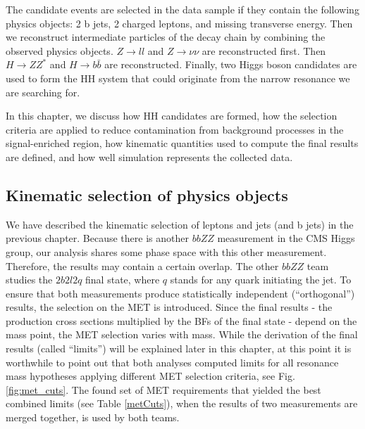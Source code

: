 The candidate events are selected in the data sample if they contain the following physics objects: 2 b jets, 2 charged leptons, and missing transverse energy. Then we reconstruct intermediate particles of the decay chain by combining the observed physics objects. $Z \to ll$ and $Z \to \nu \nu$ are reconstructed first. Then $H \to ZZ^*$ and $H \to b\bar{b}$ are reconstructed. Finally, two Higgs boson candidates are used to form the HH system that could originate from the narrow resonance we are searching for.

In this chapter, we discuss how HH candidates are formed, how the selection criteria are applied to reduce contamination from background processes in the signal-enriched region, how kinematic quantities used to compute the final results are defined, and how well simulation represents the collected data.

\subsection{Kinematic selection of physics objects}
We have described the kinematic selection of leptons and jets (and b jets) in the previous chapter. Because there is another $bbZZ$ measurement in the CMS Higgs group, our analysis shares some phase space with this other measurement. Therefore, the results may contain a certain overlap. The other $bbZZ$ team studies the $2 b 2 l 2 q$ final state, where $q$ stands for any quark initiating the jet. To ensure that both measurements produce statistically independent (``orthogonal'') results, the selection on the MET is introduced. Since the final results - the production cross sections multiplied by the BFs of the final state - depend on the mass point, the MET selection varies with mass. While the derivation of the final results (called ``limits'') will be explained later in this chapter, at this point it is worthwhile to point out that both analyses computed limits for all resonance mass hypotheses applying different MET selection criteria, see Fig. \ref{fig:met_cuts}. The found set of MET requirements that yielded the best combined limits (see Table \ref{metCuts}), when the results of two measurements are merged together, is used by both teams. %

